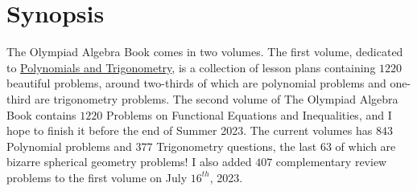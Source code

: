 \documentclass[12pt,a4paper]{memoir}
\theoremstyle{definition}
\begin{document}
%	
%	
%	
%	
	
	\section*{Synopsis}
		The Olympiad Algebra Book comes in two volumes. The first volume, dedicated to \href{https://www.academia.edu/101938068/The_Olympiad_Algebra_Book_Vol_I_1220_Polynomials_and_Trigonometry_Problems}{Polynomials and Trigonometry}, is a collection of lesson plans containing $1220$ beautiful problems, around two-thirds of which are polynomial problems and one-third are trigonometry problems. The second volume of The Olympiad Algebra Book contains $1220$ Problems on Functional Equations and Inequalities, and I hope to finish it before the end of Summer 2023. The current volumes has $843$ Polynomial problems and $377$ Trigonometry questions, the last $63$ of which are bizarre spherical geometry problems! I also added $407$ complementary review problems to the first volume on July $16^{th}$, 2023.
		
\end{document}
